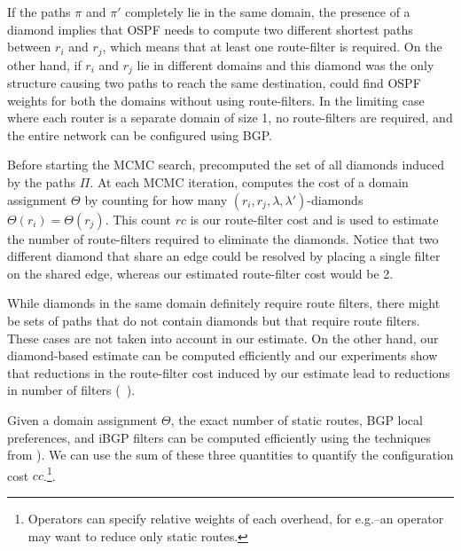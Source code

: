 If the paths $\pi$ and $\pi'$ completely lie in the same domain,
the presence of a diamond 
implies that OSPF needs to compute two different shortest paths between $r_i$ and $r_j$, 
which means that
at least one route-filter is required.
On the other hand, if $r_i$ and $r_j$ lie in
different domains and this diamond
was the only structure causing two paths to reach the same destination, \name could find OSPF weights for
both the domains without using route-filters. 
In the limiting
case where each router is a separate domain of size 1,
no route-filters are required, and the entire 
network can be configured using BGP. 

Before  starting the MCMC search, \name precomputed
the set of all diamonds induced by the paths $\Pi$. 
At each MCMC iteration, \name computes the cost of a
domain assignment $\Theta$ by counting for how many $(r_i, r_j, \lambda, \lambda')$-diamonds
$\Theta(r_i) = \Theta(r_j)$. This count $rc$ is our route-filter cost and is used to estimate the number of route-filters
required to eliminate the diamonds.
Notice that two different diamond that share an edge could be resolved
by placing a single filter on the shared edge, whereas our estimated route-filter cost 
would be 2. 

While diamonds in the same domain definitely require route filters, there might be
sets of paths that do not contain diamonds but that require route filters. 
These cases are not
taken into account in our estimate. 
On the other hand, our diamond-based estimate
can be computed efficiently and 
our experiments show that reductions in the route-filter cost induced by our estimate
lead to reductions in number of filters (~). 

Given a domain assignment $\Theta$, the exact number of static routes,
BGP local preferences, and iBGP filters can be computed 
efficiently  using the techniques from ).
We can use the sum of these three quantities to quantify the
configuration cost $cc$.\footnote{
	Operators can specify relative weights of each overhead, for e.g.--an
	operator may want to reduce only static routes.}.

